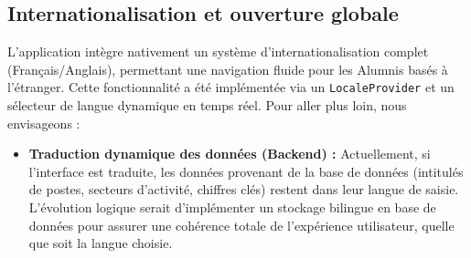 \documentclass[a4paper,12pt]{article}
\begin{document}
\subsection{Internationalisation et ouverture globale}
L'application intègre nativement un système d'internationalisation complet (Français/Anglais), permettant une navigation fluide pour les Alumnis basés à l'étranger. Cette fonctionnalité a été implémentée via un \texttt{LocaleProvider} et un sélecteur de langue dynamique en temps réel. Pour aller plus loin, nous envisageons :
\begin{itemize}[label=\textbullet, itemsep=5pt]
    \item \textbf{Traduction dynamique des données (Backend) :} Actuellement, si l'interface est traduite, les données provenant de la base de données (intitulés de postes, secteurs d'activité, chiffres clés) restent dans leur langue de saisie. L'évolution logique serait d'implémenter un stockage bilingue en base de données pour assurer une cohérence totale de l'expérience utilisateur, quelle que soit la langue choisie.
\end{itemize}

\newpage
\end{document}
